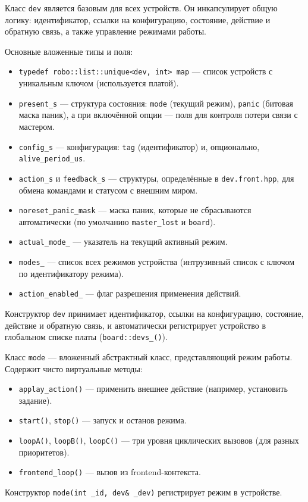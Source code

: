 \documentclass[a4paper,12pt]{article}
\begin{document}
Класс \texttt{dev} является базовым для всех устройств. Он инкапсулирует общую логику: идентификатор, ссылки на конфигурацию, состояние, действие и обратную связь, а также управление режимами работы.

Основные вложенные типы и поля:
\begin{itemize}
    \item \texttt{typedef robo::list::unique<dev, int> map} — список устройств с уникальным ключом (используется платой).
    \item \texttt{present\_s} — структура состояния: \texttt{mode} (текущий режим), \texttt{panic} (битовая маска паник), а при включённой опции — поля для контроля потери связи с мастером.
    \item \texttt{config\_s} — конфигурация: \texttt{tag} (идентификатор) и, опционально, \texttt{alive\_period\_us}.
    \item \texttt{action\_s} и \texttt{feedback\_s} — структуры, определённые в \texttt{dev.front.hpp}, для обмена командами и статусом с внешним миром.
    \item \texttt{noreset\_panic\_mask} — маска паник, которые не сбрасываются автоматически (по умолчанию \texttt{master\_lost} и \texttt{board}).
    \item \texttt{actual\_mode\_} — указатель на текущий активный режим.
    \item \texttt{modes\_} — список всех режимов устройства (интрузивный список с ключом по идентификатору режима).
    \item \texttt{action\_enabled\_} — флаг разрешения применения действий.
\end{itemize}

Конструктор \texttt{dev} принимает идентификатор, ссылки на конфигурацию, состояние, действие и обратную связь, и автоматически регистрирует устройство в глобальном списке платы (\texttt{board::devs\_()}).

Класс \texttt{mode} — вложенный абстрактный класс, представляющий режим работы. Содержит чисто виртуальные методы:
\begin{itemize}
    \item \texttt{applay\_action()} — применить внешнее действие (например, установить задание).
    \item \texttt{start()}, \texttt{stop()} — запуск и останов режима.
    \item \texttt{loopA()}, \texttt{loopB()}, \texttt{loopC()} — три уровня циклических вызовов (для разных приоритетов).
    \item \texttt{frontend\_loop()} — вызов из frontend-контекста.
\end{itemize}
Конструктор \texttt{mode(int \_id, dev\& \_dev)} регистрирует режим в устройстве.
\end{document}
